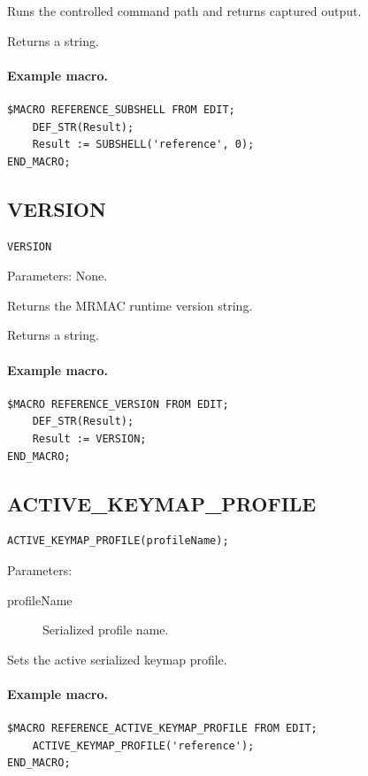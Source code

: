 \documentclass[a4paper,10pt,twoside,openany]{book}
\begin{document}
Runs the controlled command path and returns captured output.

Returns a string.

\paragraph{Example macro.}
\begin{verbatim}
$MACRO REFERENCE_SUBSHELL FROM EDIT;
    DEF_STR(Result);
    Result := SUBSHELL('reference', 0);
END_MACRO;
\end{verbatim}

\label{prim:intrinsic-version}
\subsection*{VERSION}
\begin{verbatim}
VERSION
\end{verbatim}
Parameters: None.

Returns the MRMAC runtime version string.

Returns a string.

\paragraph{Example macro.}
\begin{verbatim}
$MACRO REFERENCE_VERSION FROM EDIT;
    DEF_STR(Result);
    Result := VERSION;
END_MACRO;
\end{verbatim}

\label{prim:procedure-active-keymap-profile}
\subsection*{ACTIVE\_KEYMAP\_PROFILE}
\begin{verbatim}
ACTIVE_KEYMAP_PROFILE(profileName);
\end{verbatim}
Parameters:
\begin{description}
\item[profileName] Serialized profile name.
\end{description}

Sets the active serialized keymap profile.

\paragraph{Example macro.}
\begin{verbatim}
$MACRO REFERENCE_ACTIVE_KEYMAP_PROFILE FROM EDIT;
    ACTIVE_KEYMAP_PROFILE('reference');
END_MACRO;
\end{verbatim}
\end{document}
